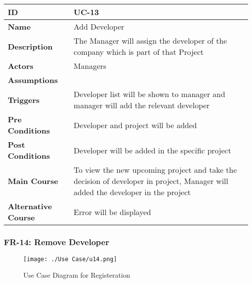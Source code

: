     \begin{center}
        \begin{tabularx}{\textwidth}{|l|X|}
            \hline
            \textbf{ID} & UC-13 \\
            \hline
            \textbf{Name} & Add Developer \\
            \hline
            \textbf{Description} & The Manager will assign the developer of the company which is part of that Project \\
            \hline
            \textbf{Actors} & Managers \\
            \hline
            \textbf{Assumptions} &  \\
            \hline
            \textbf{Triggers} & Developer list will be shown to manager and manager will add the relevant developer \\
            \hline
            \textbf{Pre Conditions} & Developer and project will be added \\
            \hline
            \textbf{Post Conditions} & Developer will be added in the specific project \\
            \hline
            \textbf{Main Course} & To view the new upcoming project and take the decision of developer in project, Manager will added the developer in the project \\
            \hline
            \textbf{Alternative Course} & Error will be displayed \\
            \hline
            
        \end{tabularx}
    \end{center}
    
    \newpage

    \subsubsection{FR-14: Remove Developer}
    \begin{figure}[H]
        \texttt{[image: ./Use Case/u14.png]}
        \centering 
        \caption{Use Case Diagram for Registeration}
        \label{fig:prototype1}
        \end{figure}
        
